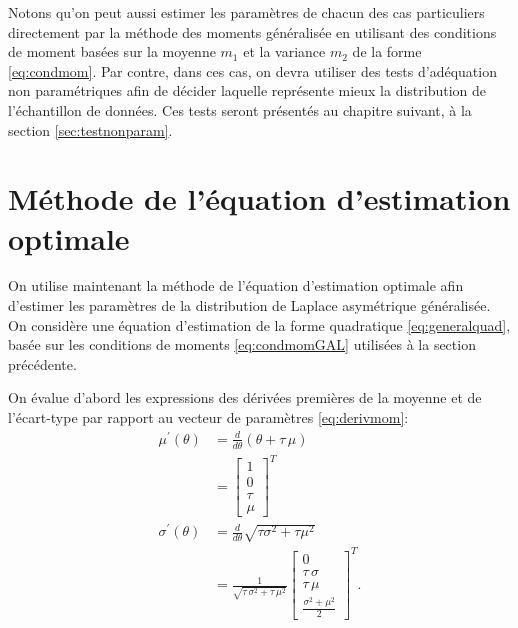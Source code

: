 Notons qu'on peut aussi estimer les paramètres de chacun des cas
particuliers directement par la méthode des moments généralisée en
utilisant des conditions de moment basées sur la moyenne $m_1$ et la
variance $m_2$ de la forme \eqref{eq:condmom}. Par contre, dans ces
cas, on devra utiliser des tests d'adéquation non paramétriques afin
de décider laquelle représente mieux la distribution de l'échantillon
de données. Ces tests seront présentés au chapitre suivant, à la
section \ref{sec:testnonparam}.

\section{Méthode de l'équation d'estimation optimale}
\label{sec:CrowderGAL}

On utilise maintenant la méthode de l'équation d'estimation optimale
afin d’estimer les paramètres de la distribution de Laplace
asymétrique généralisée. On considère une équation d'estimation de la
forme quadratique \eqref{eq:generalquad}, basée sur les conditions de
moments \eqref{eq:condmomGAL} utilisées à la section précédente.

On évalue d'abord les expressions des dérivées premières de la moyenne
et de l'écart-type par rapport au vecteur de paramètres
\eqref{eq:derivmom}:
\begin{subequations}\label{eq:derivmomGAL}
  \begin{align}
    \mu^{\prime}\left( \theta \right) &= \frac{d}{d\theta}\left(\theta+\tau\,\mu\right)  \nonumber\\
    &= \left[ \begin{array}{c} 1\\
    0\\
    \tau\\
    \mu\end{array} \right]^T \label{eq:derivmom1GAL}\\
    \sigma^{\prime}\left( \theta \right) &= \frac{d}{d\theta}\sqrt{\tau\sigma^2+\tau\mu^2} \nonumber\\
    &= \frac{1}{\sqrt {\tau\,{\sigma}^{2}+\tau\,{\mu}^{2}}}
    \left[ \begin{array}{c}
        0\\
        {\tau\,\sigma}\\
        {\tau\,\mu}\\
        \frac{{\sigma}^{2}+{\mu}^{2}}{2}
      \end{array} \right]^T.\label{eq:derivmom2GAL}
  \end{align}
\end{subequations}

